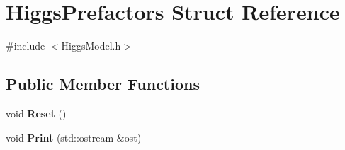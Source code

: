 \hypertarget{structHiggsPrefactors}{\section{Higgs\-Prefactors Struct Reference}
\label{structHiggsPrefactors}
}


{\ttfamily \#include $<$Higgs\-Model.\-h$>$}

\subsection*{Public Member Functions}
\begin{DoxyCompactItemize}
\item 
\hypertarget{structHiggsPrefactors_ae4f75f164a669a105c808ad2853734b2}{void {\bfseries Reset} ()}\label{structHiggsPrefactors_ae4f75f164a669a105c808ad2853734b2}

\item 
\hypertarget{structHiggsPrefactors_aafa1b3b82a178e40bd7900b1575a9997}{void {\bfseries Print} (std\-::ostream \&ost)}\label{structHiggsPrefactors_aafa1b3b82a178e40bd7900b1575a9997}

\end{DoxyCompactItemize}
